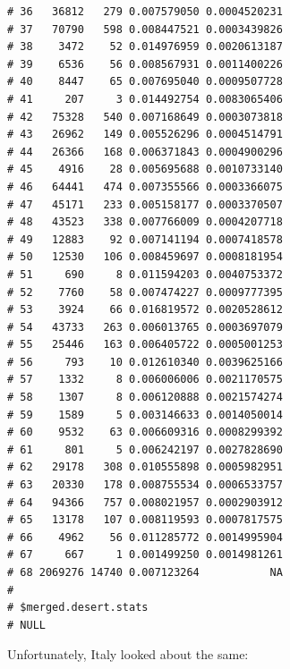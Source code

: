 \documentclass{article}\usepackage[]{graphicx}\usepackage[]{color}
\makeatletter
\newenvironment{kframe}{%
 \def\at@end@of@kframe{}%
 \ifinner\ifhmode%
  \def\at@end@of@kframe{\end{minipage}}%
  \begin{minipage}{\columnwidth}%
 \fi\fi%
 \def\FrameCommand##1{\hskip\@totalleftmargin \hskip-\fboxsep
 \colorbox{shadecolor}{##1}\hskip-\fboxsep
     \hskip-\linewidth \hskip-\@totalleftmargin \hskip\columnwidth}%
 \MakeFramed {\advance\hsize-\width
   \@totalleftmargin\z@ \linewidth\hsize
   \@setminipage}}%
 {\par\unskip\endMakeFramed%
 \at@end@of@kframe}
\newenvironment{knitrout}{}{} %
\makeatother
\begin{document}
\begin{knitrout}
\begin{kframe}
\begin{verbatim}
# 36   36812   279 0.007579050 0.0004520231
# 37   70790   598 0.008447521 0.0003439826
# 38    3472    52 0.014976959 0.0020613187
# 39    6536    56 0.008567931 0.0011400226
# 40    8447    65 0.007695040 0.0009507728
# 41     207     3 0.014492754 0.0083065406
# 42   75328   540 0.007168649 0.0003073818
# 43   26962   149 0.005526296 0.0004514791
# 44   26366   168 0.006371843 0.0004900296
# 45    4916    28 0.005695688 0.0010733140
# 46   64441   474 0.007355566 0.0003366075
# 47   45171   233 0.005158177 0.0003370507
# 48   43523   338 0.007766009 0.0004207718
# 49   12883    92 0.007141194 0.0007418578
# 50   12530   106 0.008459697 0.0008181954
# 51     690     8 0.011594203 0.0040753372
# 52    7760    58 0.007474227 0.0009777395
# 53    3924    66 0.016819572 0.0020528612
# 54   43733   263 0.006013765 0.0003697079
# 55   25446   163 0.006405722 0.0005001253
# 56     793    10 0.012610340 0.0039625166
# 57    1332     8 0.006006006 0.0021170575
# 58    1307     8 0.006120888 0.0021574274
# 59    1589     5 0.003146633 0.0014050014
# 60    9532    63 0.006609316 0.0008299392
# 61     801     5 0.006242197 0.0027828690
# 62   29178   308 0.010555898 0.0005982951
# 63   20330   178 0.008755534 0.0006533757
# 64   94366   757 0.008021957 0.0002903912
# 65   13178   107 0.008119593 0.0007817575
# 66    4962    56 0.011285772 0.0014995904
# 67     667     1 0.001499250 0.0014981261
# 68 2069276 14740 0.007123264           NA
# 
# $merged.desert.stats
# NULL
\end{verbatim}
\end{kframe}
\end{knitrout}

Unfortunately, Italy looked about the same:
\end{document}
